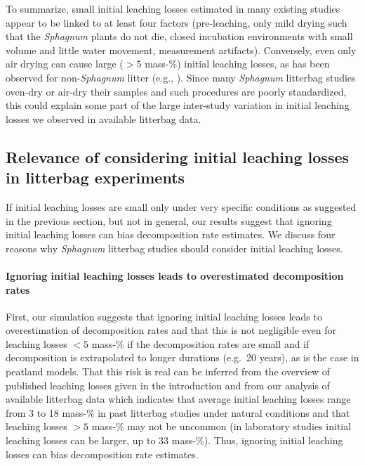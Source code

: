 \documentclass[bg, manuscript]{copernicus}
\begin{document}
To summarize, small initial leaching losses estimated in many existing studies appear to be linked to at least four factors (pre-leaching, only mild drying such that the \emph{Sphagnum} plants do not die, closed incubation environments with small volume and little water movement, measurement artifacts). Conversely, even only air drying can cause large (\(>5\) mass-\%) initial leaching losses, as has been observed for non-\emph{Sphagnum} litter (e.g., \citet{Barlocher.1997}). Since many \emph{Sphagnum} litterbag studies oven-dry or air-dry their samples and such procedures are poorly standardized, this could explain some part of the large inter-study variation in initial leaching losses we observed in available litterbag data.











\hypertarget{out-discussion-3}{%
\subsection{Relevance of considering initial leaching losses in litterbag experiments}\label{out-discussion-3}}

If initial leaching losses are small only under very specific conditions as suggested in the previous section, but not in general, our results suggest that ignoring initial leaching losses can bias decomposition rate estimates. We discuss four reasons why \emph{Sphagnum} litterbag studies should consider initial leaching losses.

\paragraph*{Ignoring initial leaching losses leads to overestimated decomposition rates}

First, our simulation suggests that ignoring initial leaching losses leads to overestimation of decomposition rates and that this is not negligible even for leaching losses \(<5\) mass-\% if the decomposition rates are small and if decomposition is extrapolated to longer durations (e.g.~20 years), as is the case in peatland models. That this risk is real can be inferred from the overview of published leaching losses given in the introduction and from our analysis of available litterbag data which indicates that average initial leaching losses range from 3 to 18 mass-\% in past litterbag studies under natural conditions and that leaching losses \(>5\) mass-\% may not be uncommon (in laboratory studies \citep{Bengtsson.2017} initial leaching losses can be larger, up to 33 mass-\%). Thus, ignoring initial leaching losses can bias decomposition rate estimates.
\end{document}
